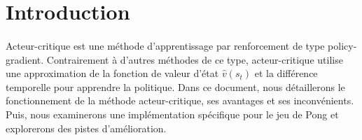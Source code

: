 \section{Introduction}

\paragraph{}
Acteur-critique est une méthode d'apprentissage par renforcement de type policy-gradient.
Contrairement à d'autres méthodes de ce type, acteur-critique utilise 
une approximation de la fonction de valeur d'état $\hat{v}(s_t)$ et la différence temporelle
pour apprendre la politique. Dans ce document,
nous détaillerons le fonctionnement de la méthode acteur-critique,
ses avantages et ses inconvénients. Puis,
nous examinerons une implémentation spécifique pour le jeu de Pong et explorerons des pistes d'amélioration.

